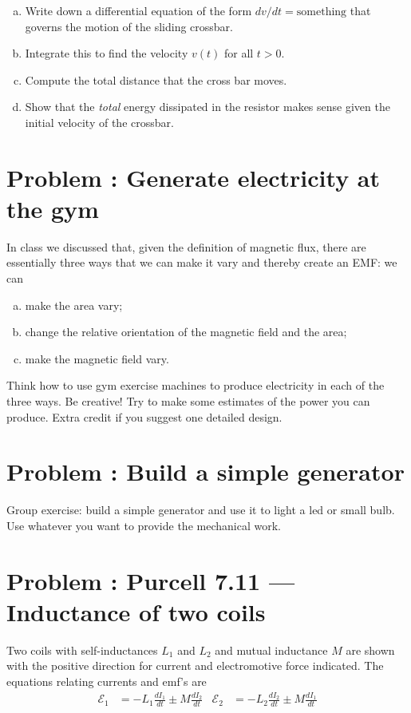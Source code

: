 \documentclass[problems]{esg8022pset}
\begin{document}
  \begin{enumerate}[(a)]
    \item Write down a differential equation of the form $dv/dt = \text{something}$ that governs the motion of the sliding crossbar.
    \item Integrate this to find the velocity $v(t)$ for all $t > 0$.
    \item Compute the total distance that the cross bar moves.
    \item Show that the \emph{total} energy dissipated in the resistor makes sense given the initial velocity of the crossbar.
  \end{enumerate}
\section{Problem \thesection: Generate electricity at the gym}
  In class we discussed that, given the definition of magnetic flux, there are essentially three ways that we can make it vary and thereby create an EMF: we can
  \begin{enumerate}[(a)]
    \item make the area vary;
    \item change the relative orientation of the magnetic field and the area;
    \item make the magnetic field vary.
  \end{enumerate}

  Think how to use gym exercise machines to produce electricity in each of the three ways. Be creative!
  Try to make some estimates of the power you can produce. Extra credit if you suggest one detailed design.
\section{Problem \thesection: Build a simple generator}
  Group exercise: build a simple generator and use it to light a led or small bulb. Use whatever you want to
  provide the mechanical work.
\section{Problem \thesection: Purcell 7.11 --- Inductance of two coils}
  Two coils with self-inductances $L_1$ and $L_2$ and mutual inductance $M$  are shown with the positive direction for current and electromotive force indicated. The equations relating currents and emf's are
  \begin{align*}
    \mathcal{E}_1 & = -L_1\frac{dI_1}{dt}\pm M\frac{dI_2}{dt}
    & \mathcal{E}_2 & = -L_2\frac{dI_2}{dt}\pm M\frac{dI_1}{dt}
  \end{align*}
\end{document}
